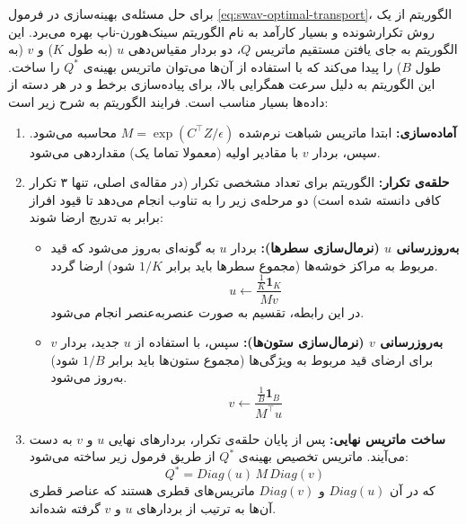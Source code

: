 برای حل مسئله‌ی بهینه‌سازی در فرمول \ref{eq:swav-optimal-transport}،
الگوریتم  از یک روش تکرارشونده و بسیار کارآمد به نام الگوریتم سینک‌هورن-ناپ\label{sec:sinkhorn}\cite{cuturi2013sinkhorn} بهره می‌برد.
این الگوریتم به جای یافتن مستقیم ماتریس 
$Q$، دو بردار مقیاس‌دهی 
$u$
(به طول $K$) و $v$ (به طول $B$)
را پیدا می‌کند که با استفاده از آن‌ها می‌توان ماتریس بهینه‌ی $Q^*$ را ساخت. این الگوریتم به دلیل سرعت همگرایی بالا، برای پیاده‌سازی برخط و در هر دسته از داده‌ها بسیار مناسب است. فرایند الگوریتم به شرح زیر است:

\begin{enumerate}
    \item \textbf{آماده‌سازی:} ابتدا ماتریس شباهت نرم‌شده $M = \exp(C^\top Z / \epsilon)$ محاسبه می‌شود. سپس، بردار 
    $v$
    با مقادیر اولیه (معمولا تماما یک) مقداردهی می‌شود.
    \item \textbf{حلقه‌ی تکرار:} الگوریتم برای تعداد مشخصی تکرار (در مقاله‌ی اصلی، تنها ۳ تکرار کافی دانسته شده است) دو مرحله‌ی زیر را به تناوب انجام می‌دهد تا قیود افراز برابر به تدریج ارضا شوند:
    \begin{itemize}
	\item \textbf{به‌روزرسانی $u$ (نرمال‌سازی سطرها):} بردار $u$ به گونه‌ای به‌روز می‌شود که قید مربوط به مراکز خوشه‌ها (مجموع سطرها باید برابر $1/K$ شود) ارضا گردد.
	\begin{equation}
		u \leftarrow \frac{\frac{1}{K} \mathbf{1}_K}{M v}
		\label{eq:update_u}
	\end{equation}
	در این رابطه، تقسیم به صورت عنصربه‌عنصر انجام می‌شود.
	
	\item \textbf{به‌روزرسانی $v$ (نرمال‌سازی ستون‌ها):} سپس، با استفاده از $u$ جدید، بردار $v$ برای ارضای قید مربوط به ویژگی‌ها (مجموع ستون‌ها باید برابر $1/B$ شود) به‌روز می‌شود.
	\begin{equation}
		v \leftarrow \frac{\frac{1}{B} \mathbf{1}_B}{M^\top u}
		\label{eq:update_v}
	\end{equation}
\end{itemize}

\item \textbf{ساخت ماتریس نهایی:} پس از پایان حلقه‌ی تکرار، بردارهای نهایی $u$ و $v$ به دست می‌آیند. ماتریس تخصیص بهینه‌ی $Q^*$ از طریق فرمول زیر ساخته می‌شود:
\begin{equation}
	Q^* = Diag(u) \, M \, Diag(v)
	\label{eq:final_q}
\end{equation}
که در آن $Diag(u)$ و $Diag(v)$ ماتریس‌های قطری هستند که عناصر قطری آن‌ها به ترتیب از بردارهای $u$ و $v$ گرفته شده‌اند.
\end{enumerate}

